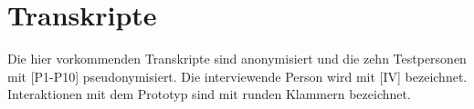\section{Transkripte}
Die hier vorkommenden Transkripte sind anonymisiert und die zehn Testpersonen mit [P1-P10] pseudonymisiert.
Die interviewende Person wird mit [IV] bezeichnet.
Interaktionen mit dem Prototyp sind mit runden Klammern bezeichnet.
